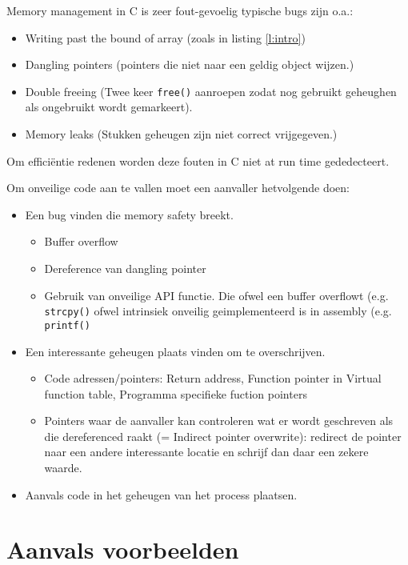 \documentclass[../main.tex]{subfiles}
\begin{document}
Memory management in C is zeer fout-gevoelig typische bugs zijn o.a.:
\begin{itemize}
		\item Writing past the bound of array (zoals in listing \ref{l:intro})
		\item Dangling pointers (pointers die niet naar een geldig object wijzen.)
		\item Double freeing (Twee keer \lstinline[style=cstyle]{free()} aanroepen zodat nog gebruikt geheughen als ongebruikt wordt gemarkeert).
		\item Memory leaks (Stukken geheugen zijn niet correct vrijgegeven.)
\end{itemize}
Om effici\"entie redenen worden deze fouten in C niet at run time gededecteert.

Om onveilige code aan te vallen moet een aanvaller hetvolgende doen:
\begin{itemize}
		\item Een bug vinden die memory safety breekt.
				\begin{itemize}
						\item Buffer overflow
						\item Dereference van dangling pointer
						\item Gebruik van onveilige API functie. Die ofwel een buffer overflowt (e.g. \lstinline[style=cstyle]{strcpy()} ofwel intrinsiek onveilig geimplementeerd is in assembly (e.g. \lstinline[style=cstyle]{printf()}
				\end{itemize}
		\item Een interessante geheugen plaats vinden om te overschrijven.
				\begin{itemize}
								\item Code adressen/pointers: Return address, Function pointer in Virtual function table, Programma specifieke fuction pointers
								\item Pointers waar de aanvaller kan controleren wat er wordt geschreven als die dereferenced raakt (= Indirect pointer overwrite): redirect de pointer naar een andere interessante locatie en schrijf dan daar een zekere waarde.
				\end{itemize}
		\item Aanvals code in het geheugen van het process plaatsen.
\end{itemize}

\section{Aanvals voorbeelden}
\end{document}
